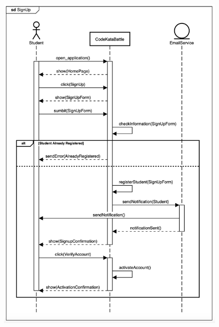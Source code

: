 \documentclass{Configuration_Files/Template}
\begin{document}
\begin{figure}[H]
\includegraphics[scale = 0.45]{Images/SequenceDiagrams/StudentSignUpSeqDiagram.png}\\
\centering
\end{figure}
\end{document}
